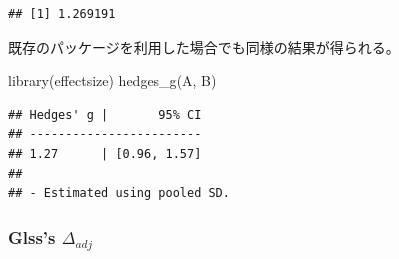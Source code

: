 \documentclass[
  ja=standard, xelatex, base=12pt]{bxjsreport}
\newenvironment{Shaded}{\begin{snugshade}}{\end{snugshade}}
\newcommand{\CommentTok}[1]{\textcolor[rgb]{0.56,0.35,0.01}{\textit{#1}}}
\newcommand{\DecValTok}[1]{\textcolor[rgb]{0.00,0.00,0.81}{#1}}
\newcommand{\FunctionTok}[1]{\textcolor[rgb]{0.00,0.00,0.00}{#1}}
\newcommand{\NormalTok}[1]{#1}
\newcommand{\OtherTok}[1]{\textcolor[rgb]{0.56,0.35,0.01}{#1}}
\newcommand{\SpecialCharTok}[1]{\textcolor[rgb]{0.00,0.00,0.00}{#1}}
\begin{document}
\begin{Shaded}
\end{Shaded}

\begin{verbatim}
## [1] 1.269191
\end{verbatim}

既存のパッケージを利用した場合でも同様の結果が得られる。

\begin{Shaded}
\begin{Highlighting}[]
\FunctionTok{library}\NormalTok{(effectsize)}
\FunctionTok{hedges\_g}\NormalTok{(A, B)}
\end{Highlighting}
\end{Shaded}

\begin{verbatim}
## Hedges' g |       95% CI
## ------------------------
## 1.27      | [0.96, 1.57]
## 
## - Estimated using pooled SD.
\end{verbatim}

\hypertarget{glsss-delta_adj}{%
\subsubsection{\texorpdfstring{Glss's \(\Delta_{adj}\)}{Glss's \textbackslash Delta\_\{adj\}}}\label{glsss-delta_adj}}
\end{document}

